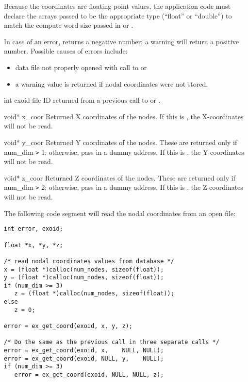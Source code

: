 Because the coordinates are floating point values, the application
code must declare the arrays passed to be the appropriate type
(``float'' or ``double'') to match the compute word size passed in
 or .


In case of an error,  returns a negative number;
a warning will return a positive number. Possible causes of errors
include:

\begin{itemize}
 \item data file not properly opened with call to 
 or 

 \item a warning value is returned if nodal coordinates were not
 stored.
\end{itemize}


\begin{parameters}
\item[{int exoid \R{}}]
\exo{} file ID returned from a previous call to 
or .

\item[{void* x_coor \W{}}]
Returned X coordinates of the nodes. If this is , the
X-coordinates will not be read.

\item[{void* y_coor \W{}}]
Returned Y coordinates of the nodes. These are returned only if
{num_dim} \texttt{>} 1; otherwise, pass in a dummy address. If this
is , the Y-coordinates will not be read.

\item[{void* z_coor \W{}}]
Returned Z coordinates of the nodes. These are returned only if
{num_dim} \texttt{>} 2; otherwise, pass in a dummy address. If this
is , the Z-coordinates will not be read.
\end{parameters}

The following code segment will read the nodal coordinates
from an open \exo{} file:

\begin{lstlisting}
int error, exoid;

float *x, *y, *z;

/* read nodal coordinates values from database */
x = (float *)calloc(num_nodes, sizeof(float));
y = (float *)calloc(num_nodes, sizeof(float));
if (num_dim >= 3)
   z = (float *)calloc(num_nodes, sizeof(float));
else
   z = 0;

error = ex_get_coord(exoid, x, y, z);

/* Do the same as the previous call in three separate calls */
error = ex_get_coord(exoid, x,    NULL, NULL);
error = ex_get_coord(exoid, NULL, y,    NULL);
if (num_dim >= 3)
   error = ex_get_coord(exoid, NULL, NULL, z);
\end{lstlisting}


